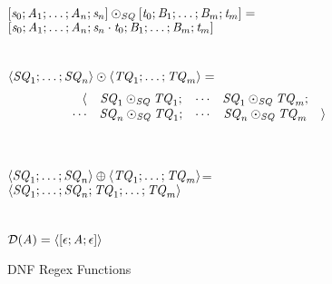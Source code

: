 \documentclass[numbers,10pt,preprint\ifanon ,nocopyrightspace\fi]{sigplanconf}
\begin{document}
\begin{figure}
  \ConcatSequence{} \OfType{} \ArrowTypeOf{\SequenceType{}}{\ArrowTypeOf{\SequenceType{}}{\SequenceType{}}}\\
  $[\mathit{s}_0;\mathit{A}_1;\ldots;\mathit{A}_n;\mathit{s}_n]\odot_{\mathit{SQ}}[\mathit{t}_0;\mathit{B}_1;\ldots;\mathit{B}_m;\mathit{t}_m]=$\\
  \hspace*{2ex}$[\mathit{s}_0;\mathit{A}_1;\ldots;\mathit{A}_n;\mathit{s}_n\cdot\mathit{t}_0;\mathit{B}_1;\ldots;\mathit{B}_m;\mathit{t}_m]$\\
  \\
  \ConcatDNF{} \OfType{} \ArrowTypeOf{\DNFRegexType{}}{\ArrowTypeOf{\DNFRegexType{}}{\DNFRegexType{}}}\\
  $\langle\mathit{SQ}_1;\ldots;\mathit{SQ}_n\rangle\odot\langle\mathit{TQ}_1;\ldots;\mathit{TQ}_m\rangle=$
\vspace*{-1.7ex}
  \[
    \begin{array}{rcccl}
      \langle & \mathit{SQ}_1\odot_{\mathit{SQ}}\mathit{TQ}_1; & \cdots
      & \mathit{SQ}_1\odot_{\mathit{SQ}}\mathit{TQ}_m; \\
      \cdots  & \mathit{SQ}_n\odot_{\mathit{SQ}}\mathit{TQ}_1; & \cdots & \mathit{SQ}_n\odot_{\mathit{SQ}}\mathit{TQ}_m & \rangle
    \end{array}
  \]
  \\
  \OrDNF{} \OfType{}
  \ArrowTypeOf{\DNFRegexType{}}{\ArrowTypeOf{\DNFRegexType{}}{\DNFRegexType{}}
  }\\
  $\langle\mathit{SQ}_1;\ldots;\mathit{SQ}_n\rangle\oplus\langle\mathit{TQ}_1;\ldots;\mathit{TQ}_m\rangle$=\\
  \hspace*{2ex}$\langle\mathit{SQ}_1;\ldots;\mathit{SQ}_n;\mathit{TQ}_1;\ldots;\mathit{TQ}_m\rangle$
  \\\\
  \AtomToDNF{} \OfType
  \ArrowTypeOf{\AtomType{}}{\DNFRegexType{}}\\
  $\mathcal{D}(\mathit{A}) = \langle[\epsilon;\mathit{A};\epsilon]\rangle$
  \caption{DNF Regex Functions}
  \label{fig:dnf-regex-functions}
\end{figure}
\end{document}
